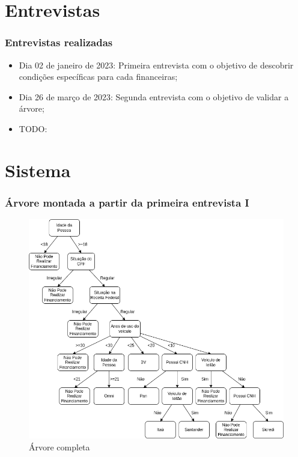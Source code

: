 \documentclass[12pt]{beamer}
\begin{document}
\section{Entrevistas}
\begin{frame}
    \frametitle{Entrevistas realizadas}

    \begin{itemize}
        \item Dia 02 de janeiro de 2023: Primeira entrevista com o objetivo de descobrir condições específicas para cada financeiras;
        \item Dia 26 de março de 2023: Segunda entrevista com o objetivo de validar a árvore;
        \item TODO:
    \end{itemize}

\end{frame}

\section{Sistema}

\begin{frame}
    \frametitle{Árvore montada a partir da primeira entrevista I}
    \begin{figure}
        \centering
        \includegraphics[height=.70\textheight]{1.png}
        \caption{Árvore completa}
    \end{figure} 
\end{frame}
\end{document}
